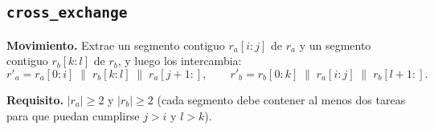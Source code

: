 \documentclass[12pt, a4paper]{article}
\begin{document}
\subsection{\texttt{cross\_exchange}}

\textbf{Movimiento.} Extrae un segmento contiguo $r_a[i{:}j]$ de $r_a$ y un
segmento contiguo $r_b[k{:}l]$ de $r_b$, y luego los intercambia:
\[
    r'_a = r_a[0{:}i] \;\|\; r_b[k{:}l] \;\|\; r_a[j{+}1{:}],
    \qquad
    r'_b = r_b[0{:}k] \;\|\; r_a[i{:}j] \;\|\; r_b[l{+}1{:}].
\]

\textbf{Requisito.} $|r_a| \geq 2$ y $|r_b| \geq 2$ (cada segmento debe
contener al menos dos tareas para que puedan cumplirse $j > i$ y $l > k$).

\begin{algorithm}[H]
\DontPrintSemicolon
\caption{\texttt{cross\_exchange} --- Intercambiar segmentos contiguos entre dos rutas}
\label{alg:cross-exchange}



\end{algorithm}
\end{document}
